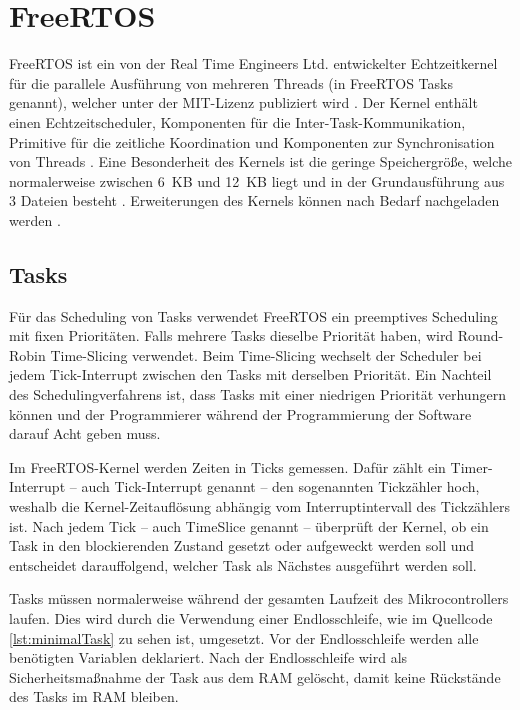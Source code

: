 \section{FreeRTOS}
FreeRTOS ist ein von der Real Time Engineers Ltd. entwickelter Echtzeitkernel für die parallele Ausführung von mehreren Threads (in FreeRTOS Tasks genannt), welcher unter der MIT-Lizenz publiziert wird \cites[S.~2]{barryFreeRTOS}{freeRTOSAbout}{freeRTOSLicense}. Der Kernel enthält einen Echtzeitscheduler, Komponenten für die Inter-Task-Kommunikation, Primitive für die zeitliche Koordination und Komponenten zur Synchronisation von Threads \cite{freeRTOSAbout}. Eine Besonderheit des Kernels ist die geringe Speichergröße, welche normalerweise zwischen 6~KB und 12~KB liegt und in der Grundausführung aus 3 Dateien besteht \cites{freeRTOSKernel}{freeRTOSSource}. Erweiterungen des Kernels können nach Bedarf nachgeladen werden \cite{freeRTOSSource}.

\subsection{Tasks}
Für das Scheduling von Tasks verwendet FreeRTOS ein preemptives Scheduling mit fixen Prioritäten. Falls mehrere Tasks dieselbe Priorität haben, wird Round-Robin Time-Slicing verwendet. Beim Time-Slicing wechselt der Scheduler bei jedem Tick-Interrupt zwischen den Tasks mit derselben Priorität. Ein Nachteil des Schedulingverfahrens ist, dass Tasks mit einer niedrigen Priorität verhungern können und der Programmierer während der Programmierung der Software darauf Acht geben muss. \cites{freeRTOSFAQScheduling}{freeRTOSScheduling}

Im FreeRTOS-Kernel werden Zeiten in Ticks gemessen. Dafür zählt ein Timer-Interrupt -- auch Tick-Interrupt genannt -- den sogenannten Tickzähler hoch, weshalb die Kernel-Zeitauflösung abhängig vom Interruptintervall des Tickzählers ist. Nach jedem Tick -- auch TimeSlice genannt -- überprüft der Kernel, ob ein Task in den blockierenden Zustand gesetzt oder aufgeweckt werden soll und entscheidet darauffolgend, welcher Task als Nächstes ausgeführt werden soll. \cites[S.~61]{barryFreeRTOS}{freeRTOSTick}

Tasks müssen normalerweise während der gesamten Laufzeit des Mikrocontrollers laufen. Dies wird durch die Verwendung einer Endlosschleife, wie im Quellcode \ref{lst:minimalTask} zu sehen ist, umgesetzt. Vor der Endlosschleife werden alle benötigten Variablen deklariert. Nach der Endlosschleife wird als Sicherheitsmaßnahme der Task aus dem \acs{RAM} gelöscht, damit keine Rückstände des Tasks im \acs{RAM} bleiben. \cite[S.~46]{barryFreeRTOS}

